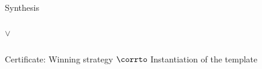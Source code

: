 \documentclass[../talk.tex]{subfiles}
\begin{document}
\begin{frame}{Synthesis}
\begin{overlayarea}{\slidewidth}{\slideheight}
\begin{center}
\begin{columns}[T]
\begin{column}{0.3\textwidth}
{                        \vspace*{1em}

                        {%
                             $\vee$\\ 
                        }
                    }
                \end{column}
            \end{columns}
        \end{center}

        \vspace*{1em}

        {%
            \vspace*{-1em}
            Certificate: \alert{Winning strategy} $\corrto$ Instantiation of the template
        }
    \end{overlayarea}
\end{frame}
\end{document}
